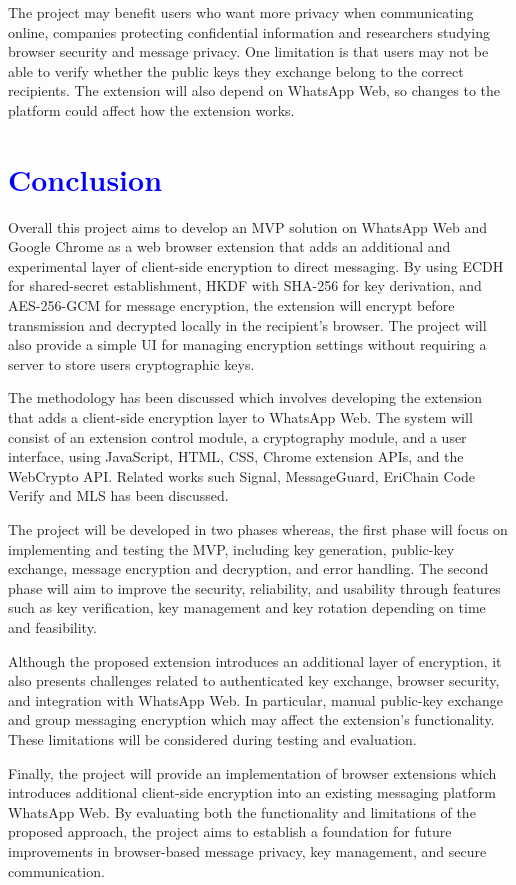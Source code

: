 \documentclass[11pt]{article}
\newcommand{\tb}{\textcolor{blue}}
\begin{document}
\noindent The project may benefit users who want more privacy when communicating online, companies protecting confidential information and researchers studying browser security and message privacy. One limitation is that users may not be able to verify whether the public keys they exchange belong to the correct recipients. The extension will also depend on WhatsApp Web, so changes to the platform could affect how the extension works.

\section{\tb{Conclusion}}
 
 
Overall this project aims to develop an MVP solution on WhatsApp Web and Google Chrome as a web browser extension that adds an additional and experimental layer of client-side encryption to direct messaging. By using ECDH for shared-secret establishment, HKDF with SHA-256 for key derivation, and AES-256-GCM for message encryption, the extension will encrypt before transmission and decrypted locally in the recipient's browser. The project will also provide a simple UI for managing encryption settings without requiring a server to store users cryptographic keys.
	
The methodology has been discussed which involves developing the extension that adds a client-side encryption layer to WhatsApp Web. The system will consist of an extension control module, a cryptography module, and a user interface, using JavaScript, HTML, CSS, Chrome extension APIs, and the WebCrypto API. Related works such Signal, MessageGuard, EriChain Code Verify and MLS has been discussed.
	
The project will be developed in two phases whereas, the first phase will focus on implementing and testing the MVP, including key generation, public-key exchange, message encryption and decryption, and error handling. The second phase will aim to improve the security, reliability, and usability through features such as key verification, key management and key rotation depending on time and feasibility.
	
Although the proposed extension introduces an additional layer of encryption, it also presents challenges related to authenticated key exchange, browser security, and integration with WhatsApp Web. In particular, manual public-key exchange and group messaging encryption which may affect the extension's functionality. These limitations will be considered during testing and evaluation.

Finally, the project will provide an implementation of browser extensions which introduces additional client-side encryption into an existing messaging platform WhatsApp Web. By evaluating both the functionality and limitations of the proposed approach, the project aims to establish a foundation for future improvements in browser-based message privacy, key management, and secure communication.
 
 

\end{document}
